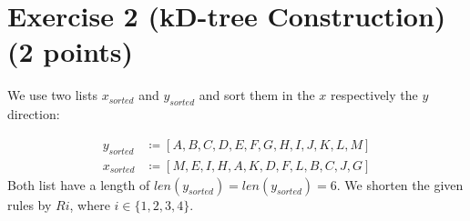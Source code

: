 \documentclass[english, fontsize=12pt, paper=a4, twoside=false, draft=true, pagesize=auto, version=last, DIV=16]{scrartcl}
\theoremstyle{break}
\begin{document}
\section*{\large Exercise 2 (kD-tree Construction) {\normalsize \hfill (2 points)}}
\vspace*{10mm}
We use two lists $x_{sorted}$ and $y_{sorted}$ and sort them in the $x$ respectively the $y$ direction: \par
\begin{equation}
\begin{aligned}
y_{sorted} & \coloneqq [A,B,C,D,E,F,G,H,I,J,K,L,M] \\[3pt]
x_{sorted} & \coloneqq [M,E,I,H,A,K,D,F,L,B,C,J,G]
\end{aligned}
\end{equation}
Both list have a length of $len(y_{sorted}) = len(y_{sorted}) = 6$. We shorten the given rules by $Ri$, where $i \in \{1,2,3,4\}$. \par
\vspace*{15mm}
\end{document}
